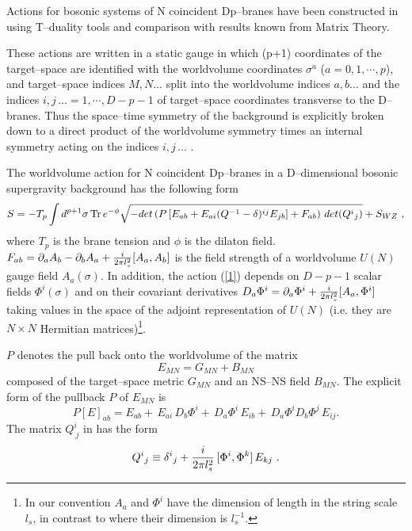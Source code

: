 \documentclass[a4paper,12pt]{article}
\begin{document}
Actions for bosonic systems of N coincident Dp--branes have been
constructed in \cite{Tseytlin:1999dj,Taylor:2000pr,Myers:1999ps}
using T--duality tools and comparison with results known from
Matrix Theory.

These actions are written in a static gauge in which (p+1)
coordinates of the target--space are identified with the
worldvolume coordinates
$\sigma^a$ ($a=0,1,\cdots,p$), and target--space indices
$M,N...$ split into the worldvolume indices $a,b...$ and the indices
$i,j\,...=1,\cdots,D-p-1$ of target--space coordinates transverse to the
D--branes.  Thus the space--time symmetry of the background is
explicitly broken down to a direct product of the worldvolume
symmetry times an internal symmetry acting on the indices
$i,j\,...$ .

The worldvolume action for N coincident Dp--branes in a
D--dimensional bosonic supergravity background has the following
form
\begin{equation}\label{1}
{S}=-T_p \int d^{p+1}\sigma\,{\rm Tr}\,e^{-\phi}\sqrt{-det\left(
P\left[E_{ab}+E_{ai}(Q^{-1}-\delta)^{ij}E_{jb}\right]+
F_{ab}\right)\,det(Q^i{}_j)}+S_{WZ}
\ ,
\end{equation}
where $T_p$ is the brane tension and $\phi$ is the dilaton field.
$F_{ab}=\partial_a A_b-\partial_b A_a+{i\over{2\pi l^2_s}}[A_a,A_b]$ is the field
strength of a worldvolume $U(N)$ gauge field $A_a(\sigma)$. In
addition, the action (\ref{1}) depends on $D-p-1$ scalar fields
$\Phi^i(\sigma)$  and on their covariant derivatives
$D_a\Phi^i=\partial_a\Phi^i+{i\over{2\pi l^2_s}}[A_a,\Phi^i]$
taking values in the
space of the adjoint representation of
$U(N)$ (i.e. they are $N\times N$ Hermitian matrices)\footnote{
In our convention $A_a$ and $\Phi^i$ have the
dimension of length in the string scale $l_s$, in contrast to
\cite{Myers:1999ps} where their dimension is $l^{-1}_s$.}.

$P$ denotes the pull back onto the worldvolume of the matrix
\begin{equation}\label{E}
E_{MN}=G_{MN}+B_{MN}
\end{equation}
composed of the target--space metric $G_{MN}$ and an NS--NS field
$B_{MN}$. The explicit form of the pullback
$P$ of $E_{MN}$
 is
\begin{equation}\label{PE}
P[E]_{ab}=E_{ab}+\,E_{ai}\,D_{b}\Phi^i+\,D_{a}\Phi^i\,E_{ib}+
\,D_a\Phi^iD_b\Phi^j\,E_{ij} .
\end{equation}
The matrix $Q^i_{~j}$ in  has the form
\begin{equation}\label{2}
Q^i{}_j\equiv\delta^i{}_j+{i\over{2\pi l^2_s}}\,[\Phi^i,\Phi^k]\,E_{kj}\ .
\end{equation}
\end{document}
